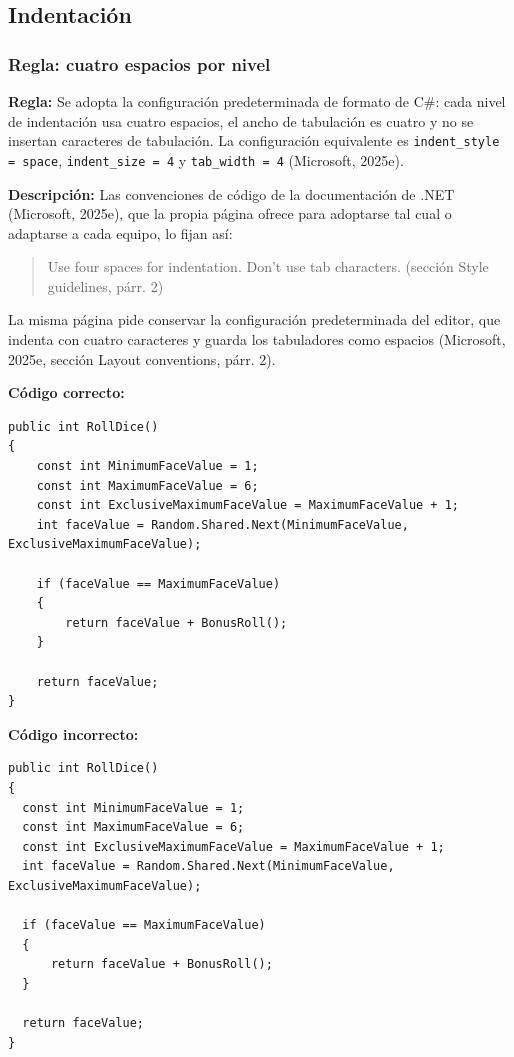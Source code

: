 \subsection{Indentación}

\subsubsection{Regla: cuatro espacios por nivel}

\textbf{Regla:} Se adopta la configuración predeterminada de formato de C\#: cada nivel de indentación usa cuatro espacios, el ancho de tabulación es cuatro y no se insertan caracteres de tabulación. La configuración equivalente es \texttt{indent\_style = space}, \texttt{indent\_size = 4} y \texttt{tab\_width = 4} (Microsoft, 2025e).

\textbf{Descripción:} Las convenciones de código de la documentación de .NET (Microsoft, 2025e), que la propia página ofrece para adoptarse tal cual o adaptarse a cada equipo, lo fijan así:
\begin{quote}
Use four spaces for indentation. Don't use tab characters. (sección Style guidelines, párr. 2)
\end{quote}
\noindent La misma página pide conservar la configuración predeterminada del editor, que indenta con cuatro caracteres y guarda los tabuladores como espacios (Microsoft, 2025e, sección Layout conventions, párr. 2).

\textbf{Código correcto:}
\begin{lstlisting}[style=csharpstyle]
public int RollDice()
{
    const int MinimumFaceValue = 1;
    const int MaximumFaceValue = 6;
    const int ExclusiveMaximumFaceValue = MaximumFaceValue + 1;
    int faceValue = Random.Shared.Next(MinimumFaceValue, ExclusiveMaximumFaceValue);

    if (faceValue == MaximumFaceValue)
    {
        return faceValue + BonusRoll();
    }

    return faceValue;
}
\end{lstlisting}

\textbf{Código incorrecto:}
\begin{lstlisting}[style=csharpstyle]
public int RollDice()
{
  const int MinimumFaceValue = 1;
  const int MaximumFaceValue = 6;
  const int ExclusiveMaximumFaceValue = MaximumFaceValue + 1;
  int faceValue = Random.Shared.Next(MinimumFaceValue, ExclusiveMaximumFaceValue);

  if (faceValue == MaximumFaceValue)
  {
      return faceValue + BonusRoll();
  }

  return faceValue;
}
\end{lstlisting}
